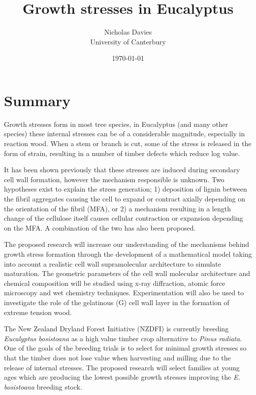 \documentclass{article}
\begin{document}
\title{Growth stresses in Eucalyptus}

\author{Nicholas Davies\\ University of Canterbury }

\date{\today}



\maketitle

\section{Summary}
Growth stresses form in most tree species, in Eucalyptus (and many other
species) these internal stresses can be of a considerable magnitude, especially
in reaction wood. When a stem or branch is cut, some of the stress is released
in the form of strain, resulting in a number of timber defects which reduce log
value.

It has been shown previously that these stresses are induced during secondary
cell wall formation, however the mechanism responsible is unknown. Two
hypotheses exist to explain the stress generation; 1) deposition of lignin
between the fibril aggregates causing the cell to expand or contract axially
depending on the orientation of the fibril (MFA), or 2) a mechanism resulting in
a length change of the cellulose itself causes cellular contraction or expansion
depending on the MFA. A combination of the two has also been proposed.

The proposed research will increase our understanding of the mechanisms behind
growth stress formation through the development of a mathematical model taking
into account a realistic cell wall supramolecular architecture to simulate
maturation. The geometric parameters of the cell wall molecular architecture and
chemical composition will be studied using x-ray diffraction, atomic force
microscopy and wet chemistry techniques. Experimentation will also be used to
investigate the role of the gelatinous (G) cell wall layer in the formation of
extreme tension wood.

The New Zealand Dryland Forest Initiative (NZDFI) is currently breeding
\textit{Eucalyptus bosistoana} as a high value timber crop alternative to
\textit{Pinus radiata}. One of the goals of the breeding trials is to select for
minimal growth stresses so that the timber does not lose value when harvesting
and milling due to the release of internal stresses. The proposed research will
select families at young ages which are producing the lowest possible growth
stresses improving the \textit{E. bosistoana} breeding stock.
\end{document}
